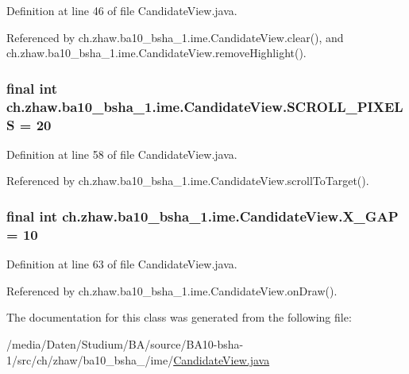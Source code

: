 Definition at line 46 of file CandidateView.java.

Referenced by ch.zhaw.ba10\_\-bsha\_\-1.ime.CandidateView.clear(), and ch.zhaw.ba10\_\-bsha\_\-1.ime.CandidateView.removeHighlight().\hypertarget{classch_1_1zhaw_1_1ba10__bsha__1_1_1ime_1_1CandidateView_ad0dedbdc2b99fa4d34b4cdd4bfe28a23}{
\subsubsection[{SCROLL\_\-PIXELS}]{\setlength{\rightskip}{0pt plus 5cm}final int {\bf ch.zhaw.ba10\_\-bsha\_\-1.ime.CandidateView.SCROLL\_\-PIXELS} = 20}}
\label{classch_1_1zhaw_1_1ba10__bsha__1_1_1ime_1_1CandidateView_ad0dedbdc2b99fa4d34b4cdd4bfe28a23}


Definition at line 58 of file CandidateView.java.

Referenced by ch.zhaw.ba10\_\-bsha\_\-1.ime.CandidateView.scrollToTarget().\hypertarget{classch_1_1zhaw_1_1ba10__bsha__1_1_1ime_1_1CandidateView_a52d99a2607cfa3d1a19b1be6ba8b10d5}{
\subsubsection[{X\_\-GAP}]{\setlength{\rightskip}{0pt plus 5cm}final int {\bf ch.zhaw.ba10\_\-bsha\_\-1.ime.CandidateView.X\_\-GAP} = 10}}
\label{classch_1_1zhaw_1_1ba10__bsha__1_1_1ime_1_1CandidateView_a52d99a2607cfa3d1a19b1be6ba8b10d5}


Definition at line 63 of file CandidateView.java.

Referenced by ch.zhaw.ba10\_\-bsha\_\-1.ime.CandidateView.onDraw().

The documentation for this class was generated from the following file:\begin{DoxyCompactItemize}
\item 
/media/Daten/Studium/BA/source/BA10-\/bsha-\/1/src/ch/zhaw/ba10\_\-bsha\_/ime/\hyperlink{CandidateView_8java}{CandidateView.java}\end{DoxyCompactItemize}
